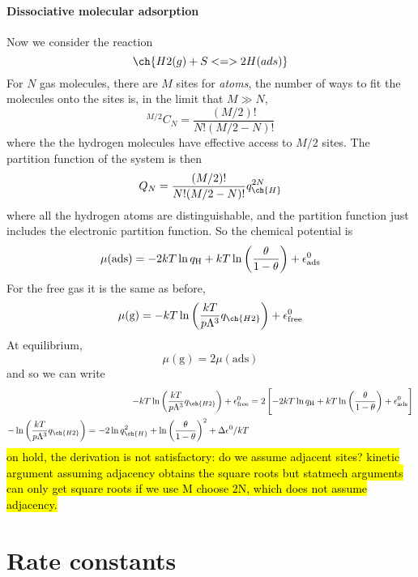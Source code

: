 \paragraph{Dissociative molecular adsorption}
Now we consider the reaction
\begin{equation*}
  \ch{H2 (g) + S <=> 2 H(ads)}
\end{equation*}
For $N$  gas molecules, there are $M$ sites for  \emph{atoms}, the number of ways to fit the molecules onto the sites is, in the limit that $M\gg N$,
\begin{equation}
 ^{M/2}C_N=\frac{(M/2)!}{N!(M/2-N)!}
\end{equation}
where the the hydrogen molecules have effective access to $M/2$ sites. The partition function of the system is then
\begin{equation}
  Q_N=\frac{(M/2)!}{N!(M/2-N)!}q_{\ch{H}}^{2N}
\end{equation}
where all the hydrogen atoms are distinguishable, and the partition function just includes the electronic partition function. So the chemical potential is
\begin{equation}
  \mu(\text{ads})=-2kT\ln q_{\text{H}}+kT\ln\left(\frac{\theta}{1-\theta} \right)+\epsilon^0_{\text{ads}}
\end{equation}
For the free gas it is the same as before,
\begin{equation}
  \mu(\text{g})=-kT\ln\lf(\frac{kT}{p\Lambda^3}q_{\ch{H2}} \rt)+\ep^0_{\text{free}}
\end{equation}
At equilibrium,
\begin{equation}
  \mu(\text{g})=2\mu(\text{ads})
\end{equation}
and so we can write
\begin{equation}
\begin{aligned}
  -kT\ln\lf(\frac{kT}{p\Lambda^3}q_{\ch{H2}} \rt)+\ep^0_{\text{free}}&=2\lf[ -2kT\ln q_{\text{H}}+kT\ln\lf(\frac{\theta}{1-\theta} \rt)+\ep^0_{\text{ads}}\rt]\\
-\ln\lf(\frac{kT}{p\Lambda^3}q_{\ch{H2}} \rt)=-2\ln q_{\ch{H}}^2+\ln\lf(\frac{\theta}{1-\theta} \rt)^2+\Delta\ep^0/kT
\end{aligned}
\end{equation}
\hl{on hold, the derivation is not satisfactory: do we assume adjacent sites? kinetic argument assuming adjacency obtains the square roots but statmech arguments can only get square roots if we use M choose 2N, which does not assume adjacency.}
\section{Rate constants}
